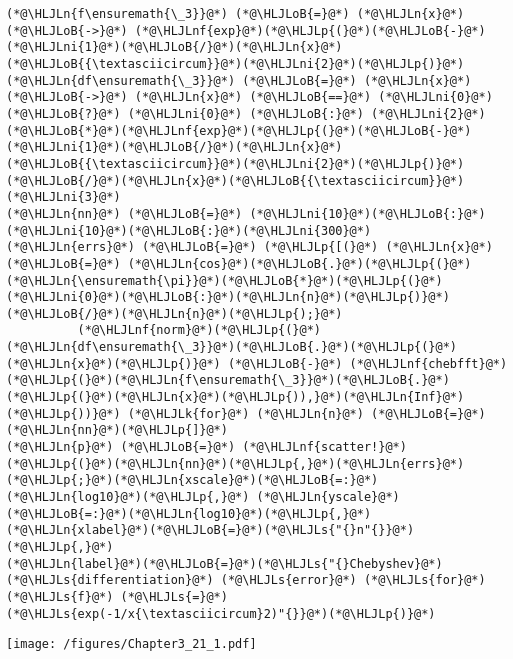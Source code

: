 \documentclass[12pt,a4paper]{article}
\newcommand{\HLJLk}[1]{\textcolor[RGB]{148,91,176}{\textbf{#1}}}
\newcommand{\HLJLn}[1]{#1}
\newcommand{\HLJLnf}[1]{\textcolor[RGB]{66,102,213}{#1}}
\newcommand{\HLJLs}[1]{\textcolor[RGB]{201,61,57}{#1}}
\newcommand{\HLJLni}[1]{\textcolor[RGB]{59,151,46}{#1}}
\newcommand{\HLJLoB}[1]{\textcolor[RGB]{102,102,102}{\textbf{#1}}}
\newcommand{\HLJLp}[1]{#1}
\begin{document}
\begin{lstlisting}
(*@\HLJLn{f\ensuremath{\_3}}@*) (*@\HLJLoB{=}@*) (*@\HLJLn{x}@*) (*@\HLJLoB{->}@*) (*@\HLJLnf{exp}@*)(*@\HLJLp{(}@*)(*@\HLJLoB{-}@*)(*@\HLJLni{1}@*)(*@\HLJLoB{/}@*)(*@\HLJLn{x}@*)(*@\HLJLoB{{\textasciicircum}}@*)(*@\HLJLni{2}@*)(*@\HLJLp{)}@*)
(*@\HLJLn{df\ensuremath{\_3}}@*) (*@\HLJLoB{=}@*) (*@\HLJLn{x}@*) (*@\HLJLoB{->}@*) (*@\HLJLn{x}@*) (*@\HLJLoB{==}@*) (*@\HLJLni{0}@*) (*@\HLJLoB{?}@*) (*@\HLJLni{0}@*) (*@\HLJLoB{:}@*) (*@\HLJLni{2}@*)(*@\HLJLoB{*}@*)(*@\HLJLnf{exp}@*)(*@\HLJLp{(}@*)(*@\HLJLoB{-}@*)(*@\HLJLni{1}@*)(*@\HLJLoB{/}@*)(*@\HLJLn{x}@*)(*@\HLJLoB{{\textasciicircum}}@*)(*@\HLJLni{2}@*)(*@\HLJLp{)}@*)(*@\HLJLoB{/}@*)(*@\HLJLn{x}@*)(*@\HLJLoB{{\textasciicircum}}@*)(*@\HLJLni{3}@*)
(*@\HLJLn{nn}@*) (*@\HLJLoB{=}@*) (*@\HLJLni{10}@*)(*@\HLJLoB{:}@*)(*@\HLJLni{10}@*)(*@\HLJLoB{:}@*)(*@\HLJLni{300}@*)
(*@\HLJLn{errs}@*) (*@\HLJLoB{=}@*) (*@\HLJLp{[(}@*) (*@\HLJLn{x}@*) (*@\HLJLoB{=}@*) (*@\HLJLn{cos}@*)(*@\HLJLoB{.}@*)(*@\HLJLp{(}@*)(*@\HLJLn{\ensuremath{\pi}}@*)(*@\HLJLoB{*}@*)(*@\HLJLp{(}@*)(*@\HLJLni{0}@*)(*@\HLJLoB{:}@*)(*@\HLJLn{n}@*)(*@\HLJLp{)}@*)(*@\HLJLoB{/}@*)(*@\HLJLn{n}@*)(*@\HLJLp{);}@*)
          (*@\HLJLnf{norm}@*)(*@\HLJLp{(}@*)(*@\HLJLn{df\ensuremath{\_3}}@*)(*@\HLJLoB{.}@*)(*@\HLJLp{(}@*)(*@\HLJLn{x}@*)(*@\HLJLp{)}@*) (*@\HLJLoB{-}@*) (*@\HLJLnf{chebfft}@*)(*@\HLJLp{(}@*)(*@\HLJLn{f\ensuremath{\_3}}@*)(*@\HLJLoB{.}@*)(*@\HLJLp{(}@*)(*@\HLJLn{x}@*)(*@\HLJLp{)),}@*)(*@\HLJLn{Inf}@*)(*@\HLJLp{))}@*) (*@\HLJLk{for}@*) (*@\HLJLn{n}@*) (*@\HLJLoB{=}@*) (*@\HLJLn{nn}@*)(*@\HLJLp{]}@*)
(*@\HLJLn{p}@*) (*@\HLJLoB{=}@*) (*@\HLJLnf{scatter!}@*)(*@\HLJLp{(}@*)(*@\HLJLn{nn}@*)(*@\HLJLp{,}@*)(*@\HLJLn{errs}@*)(*@\HLJLp{;}@*)(*@\HLJLn{xscale}@*)(*@\HLJLoB{=:}@*)(*@\HLJLn{log10}@*)(*@\HLJLp{,}@*) (*@\HLJLn{yscale}@*)(*@\HLJLoB{=:}@*)(*@\HLJLn{log10}@*)(*@\HLJLp{,}@*)(*@\HLJLn{xlabel}@*)(*@\HLJLoB{=}@*)(*@\HLJLs{"{}n"{}}@*)(*@\HLJLp{,}@*)
(*@\HLJLn{label}@*)(*@\HLJLoB{=}@*)(*@\HLJLs{"{}Chebyshev}@*) (*@\HLJLs{differentiation}@*) (*@\HLJLs{error}@*) (*@\HLJLs{for}@*) (*@\HLJLs{f}@*) (*@\HLJLs{=}@*) (*@\HLJLs{exp(-1/x{\textasciicircum}2)"{}}@*)(*@\HLJLp{)}@*)
\end{lstlisting}

\texttt{[image: /figures/Chapter3\_21\_1.pdf]}
\end{document}
